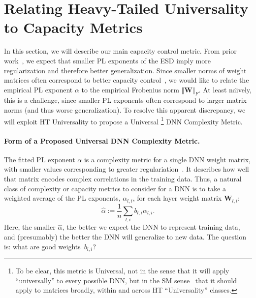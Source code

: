 \section{Relating Heavy-Tailed Universality to Capacity Metrics}
\label{sxn:theory-new}

In this section, we will describe our main capacity control metric.
%
From prior work~\cite{MM18_TR}, we expect that smaller PL exponents of the ESD imply more regularization and therefore better generalization. 
Since smaller norms of weight matrices often correspond to better capacity control~\cite{LMBx18_TR,SHNx17_TR,PLMx18_TR,BFT17_TR}, we would like to relate the empirical PL exponent $\alpha$ to the empirical Frobenius norm $\Vert\mathbf{W}\Vert_{F}$.
At least na\"{\i}vely, this is a challenge, since smaller PL exponents often correspond to larger matrix norms (and thus worse generalization).
To resolve this apparent discrepancy, we will exploit HT Universality to propose a Universal%
\footnote{To be clear, this metric is Universal, not in the sense that it will apply ``universally'' to every possible DNN, but in the SM sense~\cite{SornetteBook,BouchaudPotters03} that it should apply to matrices broadly, within and across HT ``Universality'' classes.}
DNN Complexity Metric.


\paragraph{Form of a Proposed Universal DNN Complexity Metric.} 

The fitted PL exponent $\alpha$ is a complexity metric for a single DNN weight matrix, with smaller values corresponding to greater regulariation~\cite{MM18_TR}.
It describes how well that matrix encodes complex correlations in the training data.
Thus, a natural class of complexity or capacity metrics to consider for a DNN is to take a weighted average of the PL exponents, $\alpha_{l,i}$, for each layer weight matrix $\mathbf{W}_{l,i}$:
\begin{equation}
\hat{\alpha}:=\dfrac{1}{n}\sum_{l,i}b_{l,i}\alpha_{l,i}  .
\label{eqn:alpha_hat_generic}
\end{equation}
Here, the smaller $\hat{\alpha}$, the better we expect the DNN to represent training data, and (presumably) the better the DNN will generalize to new data.
The question is: what are good weights~$b_{l,i}$?

